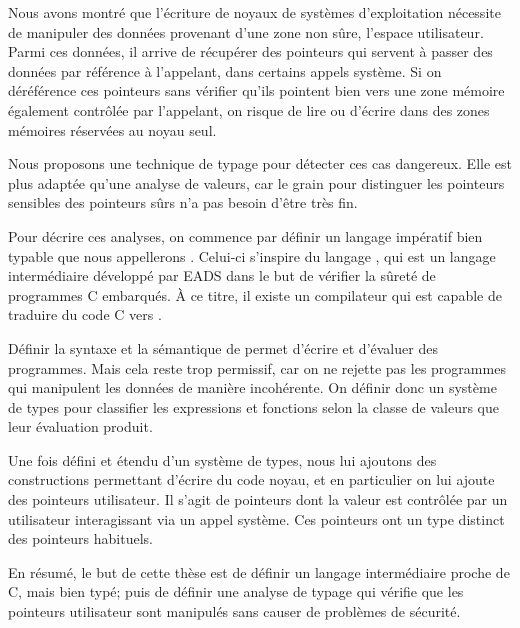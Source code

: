 Nous avons montré que l'écriture de noyaux de systèmes d'exploitation nécessite
de manipuler des données provenant d'une zone non sûre, l'espace utilisateur.
Parmi ces données, il arrive de récupérer des pointeurs qui servent à passer des
données par référence à l'appelant, dans certains appels système. Si on
déréférence ces pointeurs sans vérifier qu'ils pointent bien vers une zone
mémoire également contrôlée par l'appelant, on risque de lire ou d'écrire dans
des zones mémoires réservées au noyau seul.

Nous proposons une technique de typage pour détecter ces cas dangereux. Elle est
plus adaptée qu'une analyse de valeurs, car le grain pour distinguer les
pointeurs sensibles des pointeurs sûrs n'a pas besoin d'être très fin.

Pour décrire ces analyses, on commence par définir un langage impératif bien
typable que nous appellerons \langname.
Celui-ci s'inspire du langage \newspeak, qui est un langage intermédiaire
développé par EADS dans le but de vérifier la sûreté de programmes C embarqués.
À ce titre, il existe un compilateur qui est capable de traduire du code C vers
\newspeak.

Définir la syntaxe et la sémantique de \langname permet d'écrire et d'évaluer
des programmes. Mais cela reste trop permissif, car on ne rejette pas les
programmes qui manipulent les données de manière incohérente. On définir donc un
système de types pour classifier les expressions et fonctions selon la classe de
valeurs que leur évaluation produit.

Une fois \langname défini et étendu d'un système de types, nous lui ajoutons des
constructions permettant d'écrire du code noyau, et en particulier on lui ajoute
des pointeurs utilisateur. Il s'agit de pointeurs dont la valeur est contrôlée
par un utilisateur interagissant via un appel système. Ces pointeurs ont un type
distinct des pointeurs habituels.

En résumé, le but de cette thèse est de définir un langage intermédiaire proche
de C, mais bien typé; puis de définir une analyse de typage qui vérifie que les
pointeurs utilisateur sont manipulés sans causer de problèmes de sécurité.

